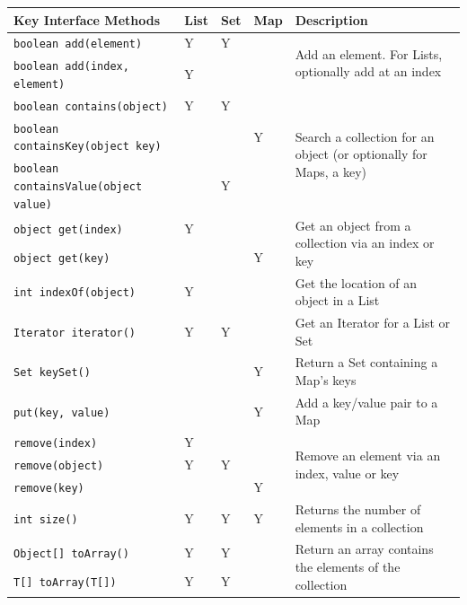 \begin{center}
\begin{tabular}{llllp{}}
    \textbf{Key Interface Methods} & \textbf{List} & \textbf{Set} & 
    \textbf{Map} & \textbf{Description} \\
    \hline
    \verb#boolean add(element)# & Y & Y & & \multirow{2}{0.3\textwidth}{Add an 
    element. For Lists, optionally add at an index} \\
    \verb#boolean add(index, element)# & Y & & & \\
    \hline
    \verb#boolean contains(object)# & Y & Y & & 
    \multirow{3}{0.3\textwidth}{Search a collection for an object (or 
    optionally for Maps, a key)} \\
    \verb#boolean containsKey(object key)# & & & Y & \\
    \verb#boolean containsValue(object value)# & & Y & \\
    \hline
    \verb#object get(index)# & Y & & & \multirow{2}{0.3\textwidth}{Get an 
    object from a collection via an index or key} \\
    \verb#object get(key)# & & & Y & \\
    \hline
    \verb#int indexOf(object)# & Y & & & Get the location of an object in a 
    List \\
    \hline
    \verb#Iterator iterator()# & Y & Y & & Get an Iterator for a List or Set \\
    \hline
    \verb#Set keySet()# & & & Y & Return a Set containing a Map's keys \\
    \hline
    \verb#put(key, value)# & & & Y & Add a key/value pair to a Map \\
    \hline
    \verb#remove(index)# & Y & & & \multirow{3}{0.3\textwidth}{Remove an 
    element via an index, value or key} \\
    \verb#remove(object)# & Y & Y & & \\
    \verb#remove(key)# & & & Y & \\
    \hline
    \verb#int size()# & Y & Y & Y & Returns the number of elements in a 
    collection \\
    \hline
    \verb#Object[] toArray()# & Y & Y & & \multirow{2}{0.3\textwidth}{Return an 
    array contains the elements of the collection} \\
    \verb#T[] toArray(T[])# & Y & Y & & \\
    \hline
\end{tabular}
\end{center}

